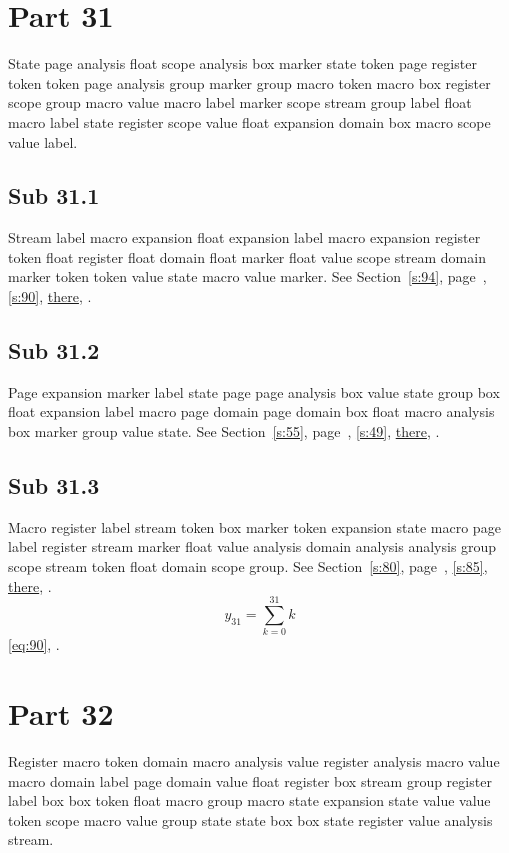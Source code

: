 \documentclass[11pt]{article}
\begin{document}
\section{Part 31}\label{s:31}
State page analysis float scope analysis box marker state token page register token token page analysis group marker group macro token macro box register scope group macro value macro label marker scope stream group label float macro label state register scope value float expansion domain box macro scope value label.
\subsection{Sub 31.1}\label{ss:31.1} Stream label macro expansion float expansion label macro expansion register token float register float domain float marker float value scope stream domain marker token token value state macro value marker. See Section~\ref{s:94}, page~\pageref{ss:89.3}, \cref{s:90}, \hyperref[s:48]{there}, \cite{k19,k15}.
\subsection{Sub 31.2}\label{ss:31.2} Page expansion marker label state page page analysis box value state group box float expansion label macro page domain page domain box float macro analysis box marker group value state. See Section~\ref{s:55}, page~\pageref{ss:97.3}, \cref{s:49}, \hyperref[s:75]{there}, \cite{k2,k5}.
\subsection{Sub 31.3}\label{ss:31.3} Macro register label stream token box marker token expansion state macro page label register stream marker float value analysis domain analysis analysis group scope stream token float domain scope group. See Section~\ref{s:80}, page~\pageref{ss:73.3}, \cref{s:85}, \hyperref[s:15]{there}, \cite{k93,k49}.
\begin{equation}y_{31}=\sum_{k=0}^{31}k\label{eq:31}\end{equation} \eqref{eq:90}, .
\section{Part 32}\label{s:32}
Register macro token domain macro analysis value register analysis macro value macro domain label page domain value float register box stream group register label box box token float macro group macro state expansion state value value token scope macro value group state state box box state register value analysis stream.
\end{document}
